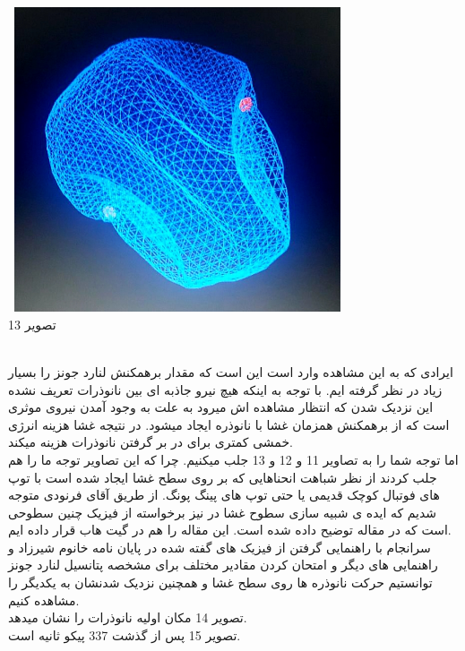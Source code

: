 \documentclass[12pt,onecolumn,a4paper]{report}
\begin{document}
\begin{center}
\includegraphics[width=10cm, height=9cm]{13.jpg}\\
\caption{تصویر 13}
\end{center}\\
ایرادی که به این مشاهده وارد است این است که مقدار برهمکنش لنارد جونز را بسیار زیاد در نظر گرفته ایم. با توجه به اینکه هیچ نیرو جاذبه ای بین نانوذرات تعریف نشده این نزدیک شدن که انتظار مشاهده اش میرود به علت به وجود آمدن نیروی موثری است که از برهمکنش همزمان غشا با نانوذره ایجاد میشود. در نتیجه غشا هزینه انرژی خمشی کمتری برای در بر گرفتن نانوذرات هزینه میکند.\\
اما توجه شما را به تصاویر 11 و 12 و 13 جلب میکنیم. چرا که این تصاویر توجه ما را هم جلب کردند از نظر شباهت انحناهایی که بر روی سطح غشا ایجاد شده است با توپ های فوتبال کوچک قدیمی یا حتی توپ های پینگ پونگ. از طریق آقای فرنودی متوجه شدیم که ایده ی شبیه سازی سطوح غشا در  نیز برخواسته از فیزیک چنین سطوحی است که در مقاله  توضیح داده شده است. این مقاله را هم در گیت هاب قرار داده ایم.\\
 سرانجام با راهنمایی گرفتن از فیزیک های گفته شده در پایان نامه خانوم شیرزاد و راهنمایی های دیگر و امتحان کردن مقادیر مختلف برای مشخصه پتانسیل لنارد جونز توانستیم حرکت نانوذره ها روی سطح غشا و همچنین نزدیک شدنشان به یکدیگر را مشاهده کنیم.\\
 تصویر 14 مکان اولیه نانوذرات را نشان میدهد.\\
تصویر 15 پس از گذشت 337 پیکو ثانیه است.
\end{document}
